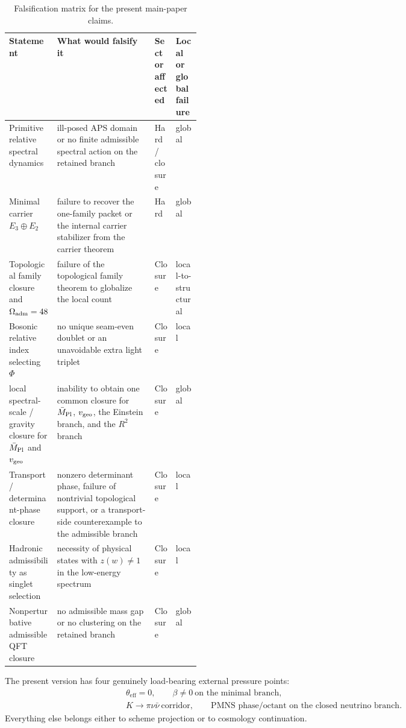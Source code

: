 \begin{table}[t]
\centering
\small
\begin{tabularx}{\linewidth}{@{}>{\raggedright\arraybackslash}p{0.24\linewidth}YY>{\raggedright\arraybackslash}p{0.13\linewidth}@{}}
\toprule
Statement & What would falsify it & Sector affected & Local or global failure \\
\midrule
Primitive relative spectral dynamics & ill-posed APS domain or no finite admissible spectral action on the retained branch & Hard / closure & global \\
Minimal carrier $E_3\oplus E_2$ & failure to recover the one-family packet or the internal carrier stabilizer from the carrier theorem & Hard & global \\
Topological family closure and $\Omega_{\mathrm{adm}}=48$ & failure of the topological family theorem to globalize the local count & Closure & local-to-structural \\
Bosonic relative index selecting $\Phi$ & no unique seam-even doublet or an unavoidable extra light triplet & Closure & local \\
local spectral-scale / gravity closure for $\bar M_{\mathrm{Pl}}$ and $v_{\mathrm{geo}}$ & inability to obtain one common closure for $\bar M_{\mathrm{Pl}}$, $v_{\mathrm{geo}}$, the Einstein branch, and the $R^2$ branch & Closure & global \\
Transport / determinant-phase closure & nonzero determinant phase, failure of nontrivial topological support, or a transport-side counterexample to the admissible branch & Closure & local \\
Hadronic admissibility as singlet selection & necessity of physical states with $z(w)\neq1$ in the low-energy spectrum & Closure & local \\
Nonperturbative admissible QFT closure & no admissible mass gap or no clustering on the retained branch & Closure & global \\
\bottomrule
\end{tabularx}
\caption{Falsification matrix for the present main-paper claims.}
\label{tab:falsification}
\end{table}

\begin{tcolorbox}[colback=blue!2, colframe=blue!50!black, breakable,
    title={Hard kill rows of the present version}, colbacktitle=blue!60!black]
The present version has four genuinely load-bearing external pressure points:
\[
\begin{aligned}
\theta_{\mathrm{eff}}=0,
\qquad
\beta\neq 0\ \text{on the minimal branch},\\
K\to\pi\nu\bar\nu\ \text{corridor},
\qquad
\text{PMNS phase/octant on the closed neutrino branch}.
\end{aligned}
\]
Everything else belongs either to scheme projection or to cosmology continuation.
\end{tcolorbox}

